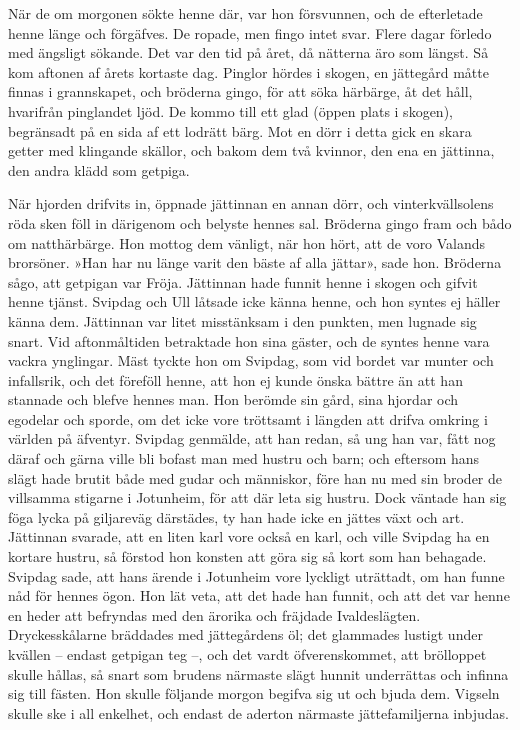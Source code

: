 När de om morgonen sökte henne där, var hon försvunnen, och de
efterletade henne länge och förgäfves. De ropade, men fingo intet svar.
Flere dagar förledo med ängsligt sökande. Det var den tid på året, då
nätterna äro som längst. Så kom aftonen af årets kortaste dag. Pinglor
hördes i skogen, en jättegård måtte finnas i grannskapet, och bröderna
gingo, för att söka härbärge, åt det håll, hvarifrån pinglandet ljöd. De
kommo till ett glad (öppen plats i skogen), begränsadt på en sida af ett
lodrätt bärg. Mot en dörr i detta gick en skara getter med klingande
skällor, och bakom dem två kvinnor, den ena en jättinna, den andra klädd
som getpiga.

När hjorden drifvits in, öppnade jättinnan en annan dörr, och
vinterkvällsolens röda sken föll in därigenom och belyste hennes sal.
Bröderna gingo fram och bådo om natthärbärge. Hon mottog dem vänligt,
när hon hört, att de voro Valands brorsöner. »Han har nu länge varit den
bäste af alla jättar», sade hon. Bröderna sågo, att getpigan var Fröja.
Jättinnan hade funnit henne i skogen och gifvit henne tjänst. Svipdag
och Ull låtsade icke känna henne, och hon syntes ej häller känna dem.
Jättinnan var litet misstänksam i den punkten, men lugnade sig snart.
Vid aftonmåltiden betraktade hon sina gäster, och de syntes henne vara
vackra ynglingar. Mäst tyckte hon om Svipdag, som vid bordet var munter
och infallsrik, och det föreföll henne, att hon ej kunde önska bättre än
att han stannade och blefve hennes man. Hon berömde sin gård, sina
hjordar och egodelar och sporde, om det icke vore tröttsamt i längden
att drifva omkring i världen på äfventyr. Svipdag genmälde, att han
redan, så ung han var, fått nog däraf och gärna ville bli bofast man med
hustru och barn; och eftersom hans slägt hade brutit både med gudar och
människor, före han nu med sin broder de villsamma stigarne i Jotunheim,
för att där leta sig hustru. Dock väntade han sig föga lycka på
giljareväg därstädes, ty han hade icke en jättes växt och art. Jättinnan
svarade, att en liten karl vore också en karl, och ville Svipdag ha en
kortare hustru, så förstod hon konsten att göra sig så kort som han
behagade. Svipdag sade, att hans ärende i Jotunheim vore lyckligt
uträttadt, om han funne nåd för hennes ögon. Hon lät veta, att det hade
han funnit, och att det var henne en heder att befryndas med den ärorika
och fräjdade Ivaldeslägten. Dryckesskålarne bräddades med jättegårdens
öl; det glammades lustigt under kvällen -- endast getpigan teg --, och
det vardt öfverenskommet, att brölloppet skulle hållas, så snart som
brudens närmaste slägt hunnit underrättas och infinna sig till fästen.
Hon skulle följande morgon begifva sig ut och bjuda dem. Vigseln skulle
ske i all enkelhet, och endast de aderton närmaste jättefamiljerna
inbjudas.

